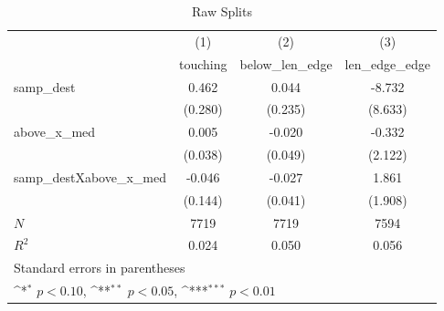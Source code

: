 \begin{table}[htbp]\centering
\def\sym#1{\ifmmode^{#1}\else\(^{#1}\)\fi}
\caption{Raw Splits}
\begin{tabular}{l*{3}{c}}
\hline\hline
            &\multicolumn{1}{c}{(1)}&\multicolumn{1}{c}{(2)}&\multicolumn{1}{c}{(3)}\\
            &\multicolumn{1}{c}{touching}&\multicolumn{1}{c}{below\_len\_edge}&\multicolumn{1}{c}{len\_edge\_edge}\\
\hline
samp\_dest   &       0.462         &       0.044         &      -8.732         \\
            &     (0.280)         &     (0.235)         &     (8.633)         \\
[1em]
above\_x\_med &       0.005         &      -0.020         &      -0.332         \\
            &     (0.038)         &     (0.049)         &     (2.122)         \\
[1em]
samp\_destXabove\_x\_med&      -0.046         &      -0.027         &       1.861         \\
            &     (0.144)         &     (0.041)         &     (1.908)         \\
\hline
\(N\)       &        7719         &        7719         &        7594         \\
\(R^{2}\)   &       0.024         &       0.050         &       0.056         \\
\hline\hline
\multicolumn{4}{l}{\footnotesize Standard errors in parentheses}\\
\multicolumn{4}{l}{\footnotesize \sym{*} \(p<0.10\), \sym{**} \(p<0.05\), \sym{***} \(p<0.01\)}\\
\end{tabular}
\end{table}
